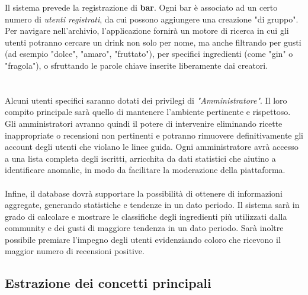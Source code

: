 \documentclass[a4paper,12pt]{report}
\begin{document}
Il sistema prevede la registrazione di \textbf{bar}. Ogni bar è associato ad un certo numero di \textit{utenti registrati}, da cui possono aggiungere una creazione "di gruppo".
\\
Per navigare nell'archivio, l'applicazione fornirà un motore di ricerca in cui gli utenti potranno cercare un drink non solo per nome, ma anche filtrando per gusti (ad esempio "dolce", "amaro", "fruttato"), per specifici ingredienti (come "gin" o "fragola"), o sfruttando le parole chiave inserite liberamente dai creatori.\\
\\
\\
Alcuni utenti specifici saranno dotati dei privilegi di \textit{"Amministratore"}. Il loro compito principale sarà quello di mantenere l'ambiente pertinente e rispettoso. Gli amministratori avranno quindi il potere di intervenire eliminando ricette inappropriate o recensioni non pertinenti e potranno rimuovere definitivamente gli account degli utenti che violano le linee guida. Ogni amministratore avrà accesso a una lista completa degli iscritti, arricchita da dati statistici che aiutino a identificare anomalie, in modo da facilitare la moderazione della piattaforma.\\
\\
Infine, il database dovrà supportare la possibilità di ottenere di informazioni aggregate, generando statistiche e tendenze in un dato periodo. Il sistema sarà in grado di calcolare e mostrare le classifiche degli ingredienti più utilizzati dalla community e dei gusti di maggiore tendenza in un dato periodo. Sarà inoltre possibile premiare l'impegno degli utenti evidenziando coloro che ricevono il maggior numero di recensioni positive.


\subsection{Estrazione dei concetti principali}
\end{document}
